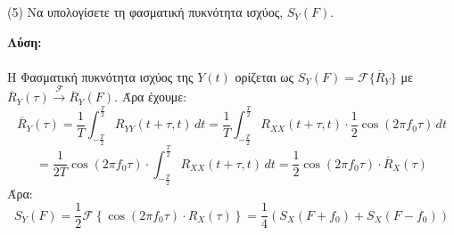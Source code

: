     
    \begin{justify}
        (5) Να υπολογίσετε τη φασματική πυκνότητα ισχύος, \( S_Y (F) \).
    \end{justify}

    \begin{justify}
        {\bf Λύση:}\\\\
        Η Φασματική πυκνότητα ισχύος της \( Y(t) \) 
        ορίζεται ως \( S_Y(F) = \mathcal{F}\{\overline{R}_Y\} \)
        με $\overline{R}_Y(\tau) \xrightarrow{\mathcal{F}} \overline{R}_Y(F).$
        Άρα έχουμε:
        \[
            \overline{R}_Y(\tau) = \frac{1}{T} 
            \int_{-\frac{T}{2}}^{\frac{T}{2}} R_{YY}(t + \tau, t) \, dt 
            = \frac{1}{T} \int_{-\frac{T}{2}}^{\frac{T}{2}} R_{XX}(t + \tau, t) 
            \cdot \frac{1}{2} \cos(2\pi f_0 \tau) \, dt  
        \]
        \[
          = \frac{1}{2T} \cos(2\pi f_0 \tau) \cdot 
          \int_{-\frac{T}{2}}^{\frac{T}{2}} R_{XX}(t + \tau, t) \, dt  
          = \frac{1}{2} \cos(2\pi f_0 \tau) \cdot \overline{R}_X(\tau)
        \]
        Άρα:
        \[
            S_Y(F) = \frac{1}{2} \mathcal{F} 
            \left\{ \cos(2\pi f_0 \tau) \cdot R_X(\tau) 
            \right\} = \frac{1}{4} \left( S_X(F + f_0) + 
            S_X(F - f_0) \right)
        \]
    \end{justify}